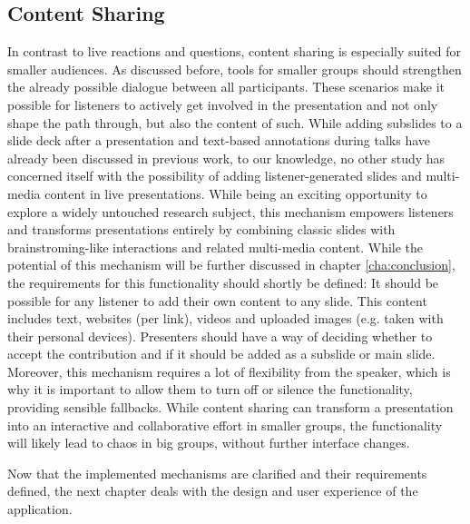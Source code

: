 \subsection{Content Sharing}
In contrast to live reactions and questions, content sharing is especially suited for smaller audiences. As discussed before, tools for smaller groups should strengthen the already possible dialogue between all participants. These scenarios make it possible for listeners to actively get involved in the presentation and not only shape the path through, but also the content of such. While adding subslides to a slide deck after a presentation \cite{Cheng:TreebasedOnlinePresentations} and text-based annotations \cite{Inoue:RealTimeQuestionnaire, Myers:CollaborationPDAs} during talks have already been discussed in previous work, to our knowledge, no other study has concerned itself with the possibility of adding listener-generated slides and multi-media content in live presentations. While being an exciting opportunity to explore a widely untouched research subject, this mechanism empowers listeners and transforms presentations entirely by combining classic slides with brainstroming-like interactions and related multi-media content. While the potential of this mechanism will be further discussed in chapter \ref{cha:conclusion}, the requirements for this functionality should shortly be defined: It should be possible for any listener to add their own content to any slide. This content includes text, websites (per link), videos and uploaded images (e.g. taken with their personal devices). Presenters should have a way of deciding whether to accept the contribution and if it should be added as a subslide or main slide. Moreover, this mechanism requires a lot of flexibility from the speaker, which is why it is important to allow them to turn off or silence the functionality, providing sensible fallbacks. While content sharing can transform a presentation into an interactive and collaborative effort in smaller groups, the functionality will likely lead to chaos in big groups, without further interface changes.

Now that the implemented mechanisms are clarified and their requirements defined, the next chapter deals with the design and user experience of the application.